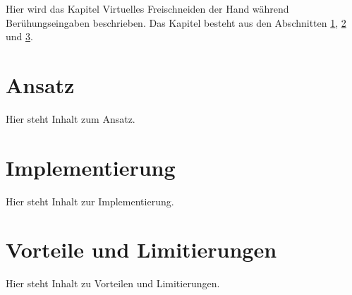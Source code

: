 Hier wird das Kapitel Virtuelles Freischneiden der Hand während Berühungseingaben beschrieben. Das Kapitel besteht aus den Abschnitten \ref{sec:ansatz}, \ref{sec:implementierung_freischneiden} und \ref{sec:vorteile_und_limitierungen_freischneiden}.


\section{Ansatz}
\label{sec:ansatz}

Hier steht Inhalt zum Ansatz.


\section{Implementierung}
\label{sec:implementierung_freischneiden}

Hier steht Inhalt zur Implementierung.


\section{Vorteile und Limitierungen}
\label{sec:vorteile_und_limitierungen_freischneiden}

Hier steht Inhalt zu Vorteilen und Limitierungen.